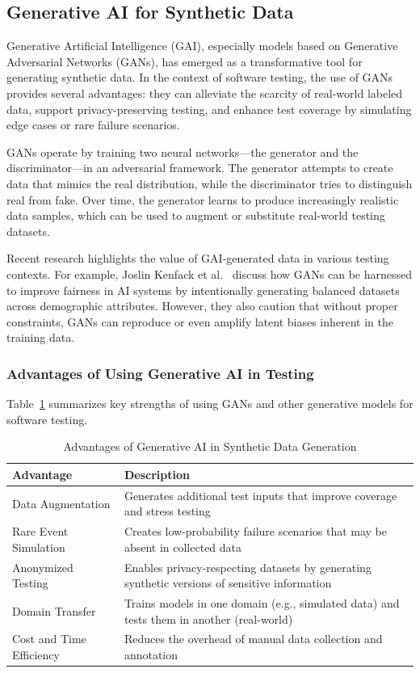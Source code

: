 \documentclass[manuscript,screen,review]{acmart}
\begin{document}
\subsection{Generative AI for Synthetic Data}

Generative Artificial Intelligence (GAI), especially models based on Generative Adversarial Networks (GANs), has emerged as a transformative tool for generating synthetic data. In the context of software testing, the use of GANs provides several advantages: they can alleviate the scarcity of real-world labeled data, support privacy-preserving testing, and enhance test coverage by simulating edge cases or rare failure scenarios.

GANs operate by training two neural networks---the generator and the discriminator---in an adversarial framework. The generator attempts to create data that mimics the real distribution, while the discriminator tries to distinguish real from fake. Over time, the generator learns to produce increasingly realistic data samples, which can be used to augment or substitute real-world testing datasets.

Recent research highlights the value of GAI-generated data in various testing contexts. For example, Joslin Kenfack et al.~\cite{Kenfack2021} discuss how GANs can be harnessed to improve fairness in AI systems by intentionally generating balanced datasets across demographic attributes. However, they also caution that without proper constraints, GANs can reproduce or even amplify latent biases inherent in the training data.

\subsubsection{Advantages of Using Generative AI in Testing}

Table~\ref{tab:gan-advantages} summarizes key strengths of using GANs and other generative models for software testing.

\begin{table}[htbp]
\centering
\caption{Advantages of Generative AI in Synthetic Data Generation}
\label{tab:gan-advantages}
\begin{tabular}{|p{4cm}|p{9cm}|}
\hline
\textbf{Advantage} & \textbf{Description} \\
\hline
Data Augmentation & Generates additional test inputs that improve coverage and stress testing \\
\hline
Rare Event Simulation & Creates low-probability failure scenarios that may be absent in collected data \\
\hline
Anonymized Testing & Enables privacy-respecting datasets by generating synthetic versions of sensitive information \\
\hline
Domain Transfer & Trains models in one domain (e.g., simulated data) and tests them in another (real-world) \\
\hline
Cost and Time Efficiency & Reduces the overhead of manual data collection and annotation \\
\hline
\end{tabular}
\end{table}
\end{document}
